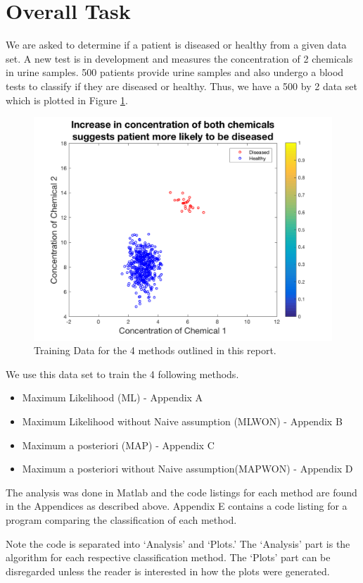 \section{Overall Task}
We are asked to determine if a patient is diseased or healthy from a given data set. A new test is in development and measures the concentration of 2 chemicals in urine samples. 500 patients provide urine samples and also undergo a blood tests to classify if they are diseased or healthy. Thus, we have a 500 by 2 data set which is plotted in Figure \ref{fig:trainingData}. 

\begin{figure}[h]
	\centering
	\includegraphics[width=0.8\linewidth]{images/MLtrainingData}
	\caption{Training Data for the 4 methods outlined in this report.}
	\label{fig:trainingData}
\end{figure}

We use this data set to train the 4 following methods. 

\begin{itemize}
	\item Maximum Likelihood (ML) - Appendix A
	\item Maximum Likelihood without Naive assumption (MLWON) - Appendix B
	\item Maximum a posteriori (MAP) - Appendix C
	\item Maximum a posteriori without Naive assumption(MAPWON) - Appendix D
\end{itemize}

The analysis was done in Matlab and the code listings for each method are found in the Appendices as described above. Appendix E contains a code listing for a program comparing the classification of each method.

Note the code is separated into `Analysis' and `Plots.' The `Analysis' part is the algorithm for each respective classification method. The `Plots' part can be disregarded unless the reader is interested in how the plots were generated.

